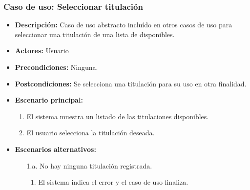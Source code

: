 \documentclass{book}
\begin{document}
\subsubsection*{Caso de uso: Seleccionar titulación}
\label{select_titulacion}
\begin{itemize}
\item{\bf Descripción:} Caso de uso abstracto incluído en otros casos de uso para seleccionar una titulación de una lista de disponibles.
\item{\bf Actores:} Usuario
\item{\bf Precondiciones:} Ninguna.
\item{\bf Postcondiciones:} Se selecciona una titulación para su uso en otra finalidad.
\item{\bf Escenario principal:}
\begin{enumerate}
\item El sistema muestra un listado de las titulaciones disponibles.
\item El usuario selecciona la titulación deseada.
\end{enumerate}
\item{\bf Escenarios alternativos:}
\begin{itemize}
\item[1.a.] No hay ninguna titulación registrada.
\begin{enumerate}
\item El sistema indica el error y el caso de uso finaliza.
\end{enumerate}
\end{itemize}
\end{itemize}
\end{document}
